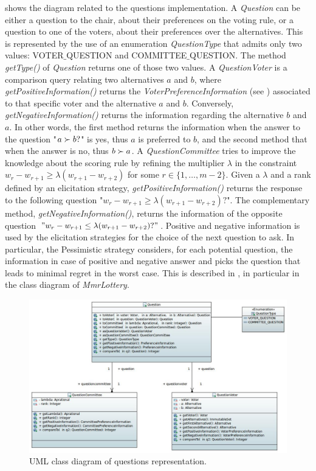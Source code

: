  shows the diagram related to the questions implementation. A \textit{Question} can be either a question to the chair, about their preferences on the voting rule, or a question to one of the voters, about their preferences over the alternatives. This is represented by the use of an enumeration \textit{QuestionType} that admits only two values: VOTER$\_$QUESTION and COMMITTEE$\_\allowbreak$QUESTION.
The method \textit{getType()} of \textit{Question} returns one of those two values.
A \textit{QuestionVoter} is a comparison query relating two alternatives $a$ and $b$, where \textit{getPositiveInformation()} returns the \textit{VoterPreferenceInformation} (see ) associated to that specific voter and the alternative $a$ and $b$. Conversely, \textit{getNegativeInformation()} returns the information regarding the alternative $b$ and $a$. In other words, the first method returns the information when the answer to the question "$a\succ b ?$" is yes, thus $a$ is preferred to $b$, and the second method that when the answer is no, thus $b\succ a$.
A \textit{QuestionCommittee} tries to improve the knowledge about the scoring rule by refining the multiplier $\lambda$ in the constraint $w_{r} - w_{r+1} \geq \lambda (w_{r+1} - w_{r+2})$ for some $r \in \{1,\ldots,m-2\}$. Given a $\lambda$ and a rank defined by an elicitation strategy, \textit{getPositiveInformation()} returns the response to the following question "$w_{r} - w_{r+1} \geq \lambda (w_{r+1} - w_{r+2})?$". The complementary method, \textit{getNegativeInformation()}, returns the information of the opposite question $"w_{r} - w_{r+1} \leq \lambda (w_{r+1} - w_{r+2})?"$.
Positive and negative information is used by the elicitation strategies for the choice of the next question to ask. In particular, the Pessimistic strategy considers, for each potential question, the information in case of positive and negative answer and picks the question that leads to minimal regret in the worst case. This is described in , in particular in the class diagram of \textit{MmrLottery}.


\begin{figure}
	\centering
	\includegraphics[width=\textwidth]{uml/questions.jpeg}
	\caption{UML class diagram of questions representation.}
	\label{uml:questions}
\end{figure}

